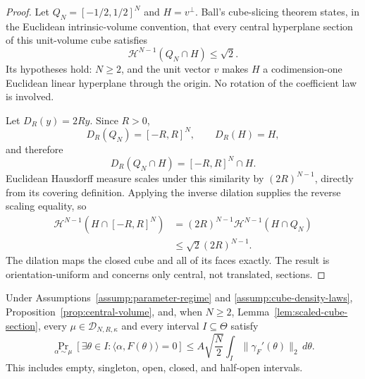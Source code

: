 \begin{proof}
Let $Q_N=[-1/2,1/2]^N$ and $H=v^\perp$.  Ball's cube-slicing theorem
\citep{ball1986cube} states, in the Euclidean intrinsic-volume convention,
that every central hyperplane section of this unit-volume cube satisfies
\begin{equation}
\mathcal H^{N-1}(Q_N\cap H)\leq\sqrt2.
\label{eq:appendix-7}
\end{equation}
Its hypotheses hold: $N\geq2$, and the unit vector $v$ makes $H$ a
codimension-one Euclidean linear hyperplane through the origin.  No rotation
of the coefficient law is involved.

Let $D_R(y)=2Ry$.  Since $R>0$,
\[
D_R(Q_N)=[-R,R]^N,
\qquad
D_R(H)=H,
\]
and therefore
\[
D_R(Q_N\cap H)=[-R,R]^N\cap H.
\]
Euclidean Hausdorff measure scales under this similarity by
$(2R)^{N-1}$, directly from its covering definition.  Applying the inverse
dilation supplies the reverse scaling equality, so
\[
\begin{aligned}
\mathcal H^{N-1}(H\cap[-R,R]^N)
&=(2R)^{N-1}\mathcal H^{N-1}(H\cap Q_N)\\
&\leq\sqrt2(2R)^{N-1}.
\end{aligned}
\]
The dilation maps the closed cube and all of its faces exactly.  The result
is orientation-uniform and concerns only central, not translated, sections.
\end{proof}

\begin{proposition}
\label{prop:central-sweep}
Under Assumptions~\ref{assump:parameter-regime} and
\ref{assump:cube-density-laws}, Proposition~\ref{prop:central-volume}, and,
when $N\geq2$, Lemma~\ref{lem:scaled-cube-section}, every
$\mu\in\mathcal D_{N,R,\kappa}$ and every interval $I\subseteq\Theta$
satisfy
\begin{equation}
\Pr_{\alpha\sim\mu}
[\exists\theta\in I:\langle\alpha,F(\theta)\rangle=0]
\leq A\sqrt{\frac N2}
\int_I\|\gamma_F'(\theta)\|_2\,d\theta.
\label{eq:appendix-8}
\end{equation}
This includes empty, singleton, open, closed, and half-open intervals.
\end{proposition}

